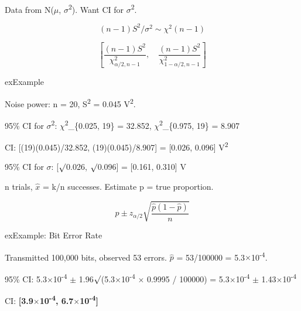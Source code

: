 

Data from N(\ensuremath{\mu}, \ensuremath{\sigma}\textsuperscript{2}). Want CI for \ensuremath{\sigma}\textsuperscript{2}.


\[(n-1)S^2/\sigma^2 \sim \chi^2(n-1)\]


\[\left[\frac{(n-1)S^2}{\chi^2_{\alpha/2, n-1}}, \quad \frac{(n-1)S^2}{\chi^2_{1-\alpha/2, n-1}}\right]\]

\begin{PSbox}[unbreakable]{ex}{Example}

Noise power: n = 20, S\textsuperscript{2} = 0.045 V\textsuperscript{2}.

95\% CI for \ensuremath{\sigma}\textsuperscript{2}: \ensuremath{\chi}\textsuperscript{2}\_\{0.025, 19\} = 32.852, \ensuremath{\chi}\textsuperscript{2}\_\{0.975, 19\} = 8.907

CI: [(19)(0.045)/32.852, (19)(0.045)/8.907] = [0.026, 0.096] V\textsuperscript{2}

95\% CI for \ensuremath{\sigma}: [\ensuremath{\surd}0.026, \ensuremath{\surd}0.096] = [0.161, 0.310] V

\end{PSbox}



n trials, \ensuremath{\hat{x}} = k/n successes. Estimate p = true proportion.


\[\hat{p} \pm z_{\alpha/2}\sqrt{\frac{\hat{p}(1-\hat{p})}{n}}\]

\begin{PSbox}[unbreakable]{ex}{Example: Bit Error Rate}

Transmitted 100,000 bits, observed 53 errors. \ensuremath{\hat{p}} = 53/100000 = 5.3\ensuremath{\times}10\textsuperscript{-4}.

95\% CI: 5.3\ensuremath{\times}10\textsuperscript{-4} \ensuremath{\pm} 1.96\ensuremath{\surd}(5.3\ensuremath{\times}10\textsuperscript{-4} \ensuremath{\times} 0.9995 / 100000) = 5.3\ensuremath{\times}10\textsuperscript{-4} \ensuremath{\pm} 1.43\ensuremath{\times}10\textsuperscript{-4}

CI: \textbf{[3.9\ensuremath{\times}10\textsuperscript{-4}, 6.7\ensuremath{\times}10\textsuperscript{-4}]}

\end{PSbox}

